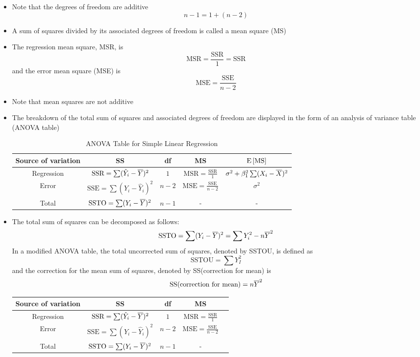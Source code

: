 \begin{itemize}
\item Note that the degrees of freedom are additive $$ n-1 = 1 + (n-2) $$ 
\item A sum of squares divided by its associated degrees of freedom is called a mean square (MS)
\item The regression mean square, MSR, is $$ \text{MSR} = \frac{\text{SSR}}{1} = \text{SSR} $$ and the error mean square (MSE) is $$ \text{MSE} = \frac{\text{SSE}}{n-2} $$ 
\item Note that mean squares are not additive 
\item The breakdown of the total sum of squares and associated degrees of freedom are displayed in the form of an analysis of variance table (ANOVA table)
\begin{table}[h!]
\centering
\begin{tabular}{|c|c|c|c|c|} \hline 
Source of variation & SS & df & MS & $\mathrm{E}\left[ \text{MS} \right]$ \\ \hline 
Regression & $\text{SSR} = \sum (\hat{Y}_i - \overline{Y})^2$ & $1$ &  $\text{MSR} = \frac{\text{SSR}}{1}$ & $\sigma^2 + \beta_1^2\sum (X_i - \overline{X})^2$ \\ \hline 
Error & $\text{SSE} = \sum (Y_i - \hat{Y}_i)^2$ & $n-2$ & $\text{MSE} = \frac{\text{SSE}}{n-2}$ & $\sigma^2$ \\ \hline 
Total & $\text{SSTO} = \sum (Y_i - \overline{Y})^2$ & $n-1$  & - & - \\ \hline \end{tabular} \caption*{ANOVA Table for Simple Linear Regression}  \end{table}
\item The total sum of squares can be decomposed as follows: $$ \text{SSTO} = \sum (Y_i - \overline{Y})^2 = \sum Y_i^2 - n\overline{Y}^2 $$ In a modified ANOVA table, the total uncorrected sum of squares, denoted by SSTOU, is defined as $$ \text{SSTOU} = \sum Y_I^2 $$ and the correction for the mean sum of squares, denoted by SS(correction for mean) is $$ \text{SS(correction for mean)} = n\overline{Y}^2 $$ 
\begin{table}[h!]
\centering
\begin{tabular}{|c|c|c|c|c|} \hline 
Source of variation & SS & df & MS \\ \hline 
Regression & $\text{SSR} = \sum (\hat{Y}_i - \overline{Y})^2$ & $1$ &  $\text{MSR} = \frac{\text{SSR}}{1}$  \\ \hline 
Error & $\text{SSE} = \sum (Y_i - \hat{Y}_i)^2$ & $n-2$ & $\text{MSE} = \frac{\text{SSE}}{n-2}$  \\ \hline 
Total & $\text{SSTO} = \sum (Y_i - \overline{Y})^2$ & $n-1$  & -  \\ \hline 

\end{tabular}
\end{table}
\end{itemize}
